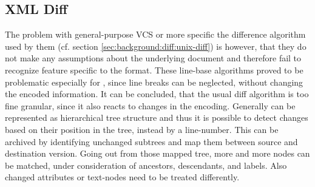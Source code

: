 	\subsection{XML Diff}
	\label{sec:background:diff:xml-diff}
	The problem with general-purpose VCS or more specific the difference algorithm used by them (cf. section \ref{sec:background:diff:unix-diff}) is however, that they do not make any assumptions about the underlying document and therefore fail to recognize feature specific to the format. These line-base algorithms proved to be problematic especially for \xml, since line breaks can be neglected, without changing the encoded information. \cite{Ronnau2005}
	It can be concluded, that the usual diff algorithm is too fine granular, since it also reacts to changes in the encoding. Generally \xml can be represented as hierarchical tree structure and thus it is possible to detect changes based on their position in the tree, instead by a line-number. \cite{Wang2003,Chawathe1996,Cobena2002}
	This can be archived by identifying unchanged subtrees and map them between source and destination version. Going out from those mapped tree, more and more nodes can be matched, under consideration of ancestors, descendants, and labels. Also changed attributes or text-nodes need to be treated differently. \cite{Cobena2002}
	
	

